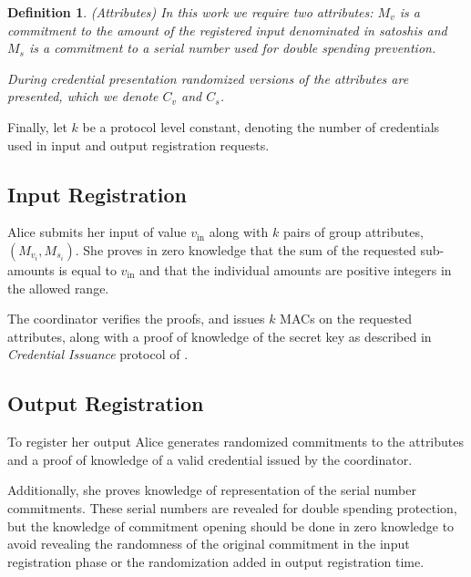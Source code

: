 \documentclass{article}
\newtheorem{definition}{Definition}[section]
\begin{document}
\begin{definition}(Attributes)
In this work we require two attributes: $M_v$ is a commitment to the amount of the registered input denominated in satoshis and $M_s$ is a commitment to a serial number used for double spending prevention.

During credential presentation randomized versions of the attributes are presented, which we denote $C_v$ and $C_s$.
\end{definition}

Finally, let $k$ be a protocol level constant, denoting the number of credentials used in input and output registration requests.

\subsection{Input Registration} 

Alice submits her input of value $v_{\mathrm{in}}$ along with $k$ pairs of group attributes,
$(M_{v_i}, M_{s_i})$.
She proves in zero knowledge that the sum of the requested sub-amounts is equal to $v_{\mathrm{in}}$ and that the individual amounts are positive integers in the allowed range.


The coordinator verifies the proofs, and issues $k$ MACs on the requested attributes, along with a proof of knowledge of the secret key as described in \textit{Credential Issuance} protocol of \cite{chase2019signal}.

\subsection{Output Registration}

To register her output Alice generates randomized commitments to the attributes and a proof of knowledge of a valid credential issued by the coordinator.

Additionally, she proves knowledge of representation of the serial number commitments. These serial numbers are revealed for double spending protection, but the knowledge of commitment opening should be done in zero knowledge to avoid revealing the randomness of the original commitment in the input registration phase or the randomization added in output registration time.
\end{document}

